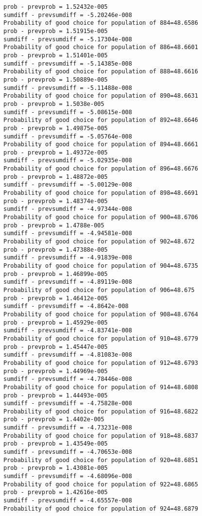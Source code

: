 \documentclass[11pt,onecolumn]{article}
\begin{document}
\begin{verbatim}
prob - prevprob = 1.52432e-005
sumdiff - prevsumdiff = -5.20246e-008
Probability of good choice for population of 884=48.6586
prob - prevprob = 1.51915e-005
sumdiff - prevsumdiff = -5.17304e-008
Probability of good choice for population of 886=48.6601
prob - prevprob = 1.51401e-005
sumdiff - prevsumdiff = -5.14385e-008
Probability of good choice for population of 888=48.6616
prob - prevprob = 1.50889e-005
sumdiff - prevsumdiff = -5.11488e-008
Probability of good choice for population of 890=48.6631
prob - prevprob = 1.5038e-005
sumdiff - prevsumdiff = -5.08615e-008
Probability of good choice for population of 892=48.6646
prob - prevprob = 1.49875e-005
sumdiff - prevsumdiff = -5.05764e-008
Probability of good choice for population of 894=48.6661
prob - prevprob = 1.49372e-005
sumdiff - prevsumdiff = -5.02935e-008
Probability of good choice for population of 896=48.6676
prob - prevprob = 1.48872e-005
sumdiff - prevsumdiff = -5.00129e-008
Probability of good choice for population of 898=48.6691
prob - prevprob = 1.48374e-005
sumdiff - prevsumdiff = -4.97344e-008
Probability of good choice for population of 900=48.6706
prob - prevprob = 1.4788e-005
sumdiff - prevsumdiff = -4.94581e-008
Probability of good choice for population of 902=48.672
prob - prevprob = 1.47388e-005
sumdiff - prevsumdiff = -4.91839e-008
Probability of good choice for population of 904=48.6735
prob - prevprob = 1.46899e-005
sumdiff - prevsumdiff = -4.89119e-008
Probability of good choice for population of 906=48.675
prob - prevprob = 1.46412e-005
sumdiff - prevsumdiff = -4.8642e-008
Probability of good choice for population of 908=48.6764
prob - prevprob = 1.45929e-005
sumdiff - prevsumdiff = -4.83741e-008
Probability of good choice for population of 910=48.6779
prob - prevprob = 1.45447e-005
sumdiff - prevsumdiff = -4.81083e-008
Probability of good choice for population of 912=48.6793
prob - prevprob = 1.44969e-005
sumdiff - prevsumdiff = -4.78446e-008
Probability of good choice for population of 914=48.6808
prob - prevprob = 1.44493e-005
sumdiff - prevsumdiff = -4.75828e-008
Probability of good choice for population of 916=48.6822
prob - prevprob = 1.4402e-005
sumdiff - prevsumdiff = -4.73231e-008
Probability of good choice for population of 918=48.6837
prob - prevprob = 1.43549e-005
sumdiff - prevsumdiff = -4.70653e-008
Probability of good choice for population of 920=48.6851
prob - prevprob = 1.43081e-005
sumdiff - prevsumdiff = -4.68096e-008
Probability of good choice for population of 922=48.6865
prob - prevprob = 1.42616e-005
sumdiff - prevsumdiff = -4.65557e-008
Probability of good choice for population of 924=48.6879

\end{verbatim}
\end{document}
